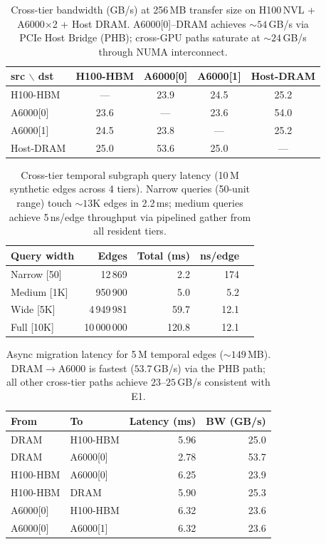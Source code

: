 \documentclass{article}
\begin{document}
\begin{table}[t]
\centering
\caption{Cross-tier bandwidth (GB/s) at 256\,MB transfer size on
H100\,NVL + A6000$\times$2 + Host DRAM. A6000[0]--DRAM achieves
${\sim}54$\,GB/s via PCIe Host Bridge (PHB); cross-GPU paths
saturate at ${\sim}24$\,GB/s through NUMA interconnect.}
\label{tab:bandwidth}
\begin{tabular}{lcccc}
\toprule
src $\backslash$ dst & H100-HBM & A6000[0] & A6000[1] & Host-DRAM \\
\midrule
H100-HBM  & --- & 23.9 & 24.5 & 25.2 \\
A6000[0]  & 23.6 & --- & 23.6 & 54.0 \\
A6000[1]  & 24.5 & 23.8 & --- & 25.2 \\
Host-DRAM & 25.0 & 53.6 & 25.0 & --- \\
\bottomrule
\end{tabular}
\end{table}

\begin{table}[t]
\centering
\caption{Cross-tier temporal subgraph query latency (10\,M synthetic edges
across 4 tiers). Narrow queries (50-unit range) touch ${\sim}13$K edges in
2.2\,ms; medium queries achieve 5\,ns/edge throughput via pipelined
gather from all resident tiers.}
\label{tab:query_latency}
\begin{tabular}{lrrrr}
\toprule
Query width & Edges & Total (ms) & ns/edge \\
\midrule
Narrow [50]  & 12\,869   & 2.2  & 174 \\
Medium [1K]  & 950\,900  & 5.0  & 5.2 \\
Wide [5K]    & 4\,949\,981 & 59.7 & 12.1 \\
Full [10K]   & 10\,000\,000 & 120.8 & 12.1 \\
\bottomrule
\end{tabular}
\end{table}

\begin{table}[t]
\centering
\caption{Async migration latency for 5\,M temporal edges (${\sim}149$\,MB).
DRAM$\to$A6000 is fastest ($53.7$\,GB/s) via the PHB path; all other
cross-tier paths achieve $23$--$25$\,GB/s consistent with E1.}
\label{tab:migration}
\begin{tabular}{llrr}
\toprule
From & To & Latency (ms) & BW (GB/s) \\
\midrule
DRAM      & H100-HBM  & 5.96 & 25.0 \\
DRAM      & A6000[0]  & 2.78 & 53.7 \\
H100-HBM  & A6000[0]  & 6.25 & 23.9 \\
H100-HBM  & DRAM      & 5.90 & 25.3 \\
A6000[0]  & H100-HBM  & 6.32 & 23.6 \\
A6000[0]  & A6000[1]  & 6.32 & 23.6 \\
\bottomrule
\end{tabular}
\end{table}
\end{document}

